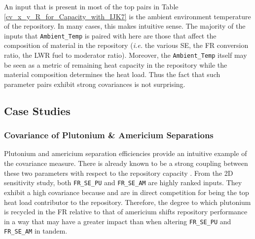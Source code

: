An input that is present in most of the top pairs in Table \ref{cv_x_y_R_for_Capacity_with_IJK7} is the
ambient environment temperature of the repository.
In many cases, this makes intuitive sense.  The majority of the inputs that 
\texttt{Ambient\_Temp} is paired with here are those that affect the composition of
material in the repository (\emph{i.e.} the various SE, the FR conversion ratio, 
the LWR fuel to moderator ratio).
Moreover, the \texttt{Ambient\_Temp} itself may be seen as a metric of remaining 
heat capacity in the repository while the material composition determines the heat load.
Thus the fact that such parameter pairs exhibit strong covariances is not surprising.



\subsection{Case Studies}
\label{cts_sec:case_studies}

\subsubsection{Covariance of Plutonium \& Americium Separations}
\label{cts_sec:pu_am_se}

Plutonium and americium separation efficiencies provide an intuitive example of 
the covariance measure.  There is already known
to be a strong coupling between these two parameters with respect to the repository 
capacity \cite{Scopatz2009c}.  From the
2D sensitivity study, both \texttt{FR\_SE\_PU} and \texttt{FR\_SE\_AM} are highly 
ranked inputs.  They exhibit
a high covariance because  and  are in direct competition 
for being the top heat load contributor to the
repository.  Therefore, the degree to which plutonium is recycled in the FR relative 
to that of americium shifts
repository performance in a way that may have a greater impact than when altering 
\texttt{FR\_SE\_PU} and \texttt{FR\_SE\_AM}
in tandem.

